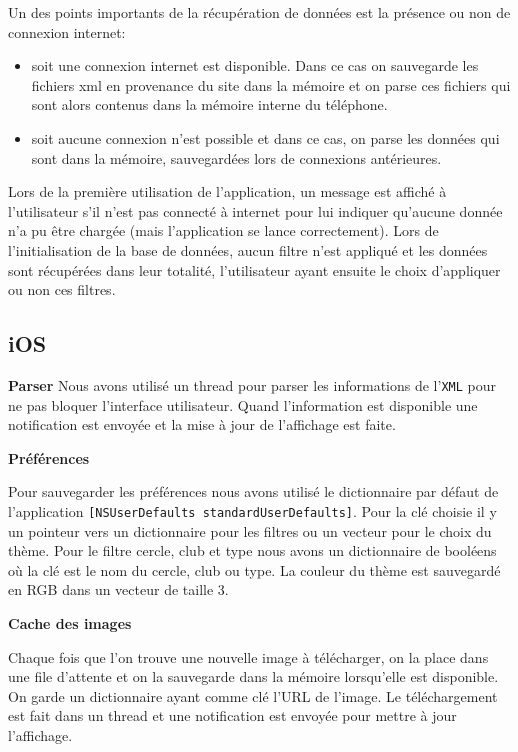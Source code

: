 \documentclass[a4paper, 11pt]{article}
\begin{document}
\vspace{0.5cm}
\noindent Un des points importants de la récupération de données est la présence ou non de connexion internet: 
\begin{itemize}
\item soit une connexion internet est disponible. Dans ce cas on sauvegarde les fichiers xml en provenance du site dans la mémoire et on parse ces fichiers qui sont alors contenus dans la mémoire interne du téléphone.
\item soit aucune connexion n'est possible et dans ce cas, on parse les données qui sont dans la mémoire, sauvegardées lors de connexions antérieures.\\
\end{itemize}

\noindent Lors de la première utilisation de l'application, un message est affiché à l'utilisateur s'il n'est pas connecté à internet pour lui indiquer qu'aucune donnée n'a pu être chargée (mais l'application se lance correctement).
 Lors de l'initialisation de la base de données, aucun filtre n'est appliqué et les données sont récupérées dans leur totalité, l'utilisateur ayant ensuite le choix d'appliquer ou non ces filtres.

\subsection{iOS}
{\bf Parser}
Nous avons utilisé un thread pour parser les informations de l'\texttt{XML} pour ne pas bloquer l'interface utilisateur. Quand l'information est disponible une notification est envoyée et la mise à jour de l'affichage est faite.


{\bf Préférences}

Pour sauvegarder les préférences nous avons utilisé le dictionnaire par défaut de l'application 
\texttt{[NSUserDefaults standardUserDefaults]}. Pour la clé choisie il y un pointeur vers un dictionnaire pour les filtres ou un vecteur pour le choix du thème. Pour le filtre cercle, club et type nous avons un dictionnaire de booléens où la clé est le nom du cercle, club ou type. La couleur du thème est sauvegardé en RGB dans un vecteur de taille 3. 
 
{\bf Cache des images}

Chaque fois que l'on trouve une nouvelle image à télécharger, on la place dans une file d'attente et on la sauvegarde dans la mémoire lorsqu'elle est disponible. On garde un dictionnaire ayant comme clé l'URL de l'image. Le téléchargement est fait dans un thread et une notification est envoyée pour mettre à jour l'affichage.
\end{document}
